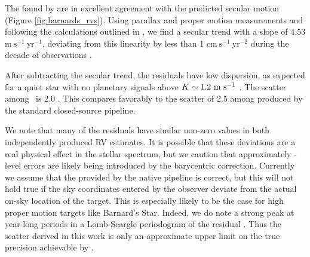\documentclass[twocolumn]{aastex62}
\newcommand{\Mdwarf}{Barnard's Star\xspace} %
\begin{document}
The \RVs found by \wobble are in excellent agreement with the predicted secular motion (Figure \ref{fig:barnards_rvs}). 
Using \gaia parallax and proper motion measurements and following the calculations outlined in \citet{Kurster2003}, we find a secular trend with a slope of 4.53 $\mathrm{m}~\mathrm{s}^{-1}~\mathrm{yr}^{-1}$, deviating from this linearity by less than 1 $\mathrm{cm}~\mathrm{s}^{-1}~\mathrm{yr}^{-2}$ during the decade of \HARPS observations \citep{gaia2016, gaia2018}. 

After subtracting the secular \RV trend, the residuals have low dispersion, as expected for a quiet star with no planetary signals above $K \sim 1.2~\mathrm{m}~\mathrm{s}^{-1}$ \citep{Choi2013, Ribas2018}. 
The  scatter among \wobble\ \RVs is 2.0 \ms. 
This compares favorably to the scatter of 2.5 \ms among \RVs produced by the standard closed-source \HARPS pipeline. 

We note that many of the residuals have similar non-zero values in both independently produced RV estimates. 
It is possible that these deviations are a real physical effect in the stellar spectrum, but we caution that approximately \ms-level errors are likely being introduced by the barycentric correction. 
Currently we assume that the \BERV provided by the native \HARPS pipeline is correct, but this will not hold true if the sky coordinates entered by the observer deviate from the actual on-sky location of the target. 
This is especially likely to be the case for high proper motion targets like \Mdwarf. 
Indeed, we do note a strong peak at year-long periods in a Lomb-Scargle periodogram of the residual \RVs. 
Thus the \RV scatter derived in this work is only an approximate upper limit on the true precision achievable by \wobble. 
\end{document}
